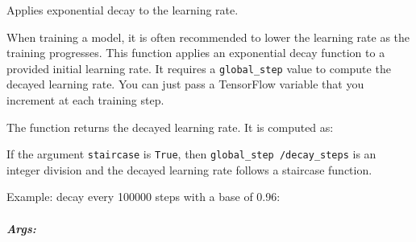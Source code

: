 Applies exponential decay to the learning rate.

When training a model, it is often recommended to lower the learning
rate as the training progresses. This function applies an exponential
decay function to a provided initial learning rate. It requires a
\texttt{global\_step} value to compute the decayed learning rate. You
can just pass a TensorFlow variable that you increment at each training
step.

The function returns the decayed learning rate. It is computed as:

\begin{Shaded}
\begin{Highlighting}[]
\OperatorTok{=} \OperatorTok{*}
                        \OperatorTok{^} \OperatorTok{/} 
\end{Highlighting}
\end{Shaded}

If the argument \texttt{staircase} is \texttt{True}, then
\texttt{global\_step\ /decay\_steps} is an integer division and the
decayed learning rate follows a staircase function.

Example: decay every 100000 steps with a base of 0.96:

\begin{Shaded}
\begin{Highlighting}[]
\OperatorTok{=} \OperatorTok{=}\NormalTok{)}
\OperatorTok{=} 
\OperatorTok{=} 
                                     \NormalTok{, }\OperatorTok{=}\NormalTok{)}
\OperatorTok{=} 
\OperatorTok{=}
\end{Highlighting}
\end{Shaded}

\subparagraph{Args: }\label{args-18}

